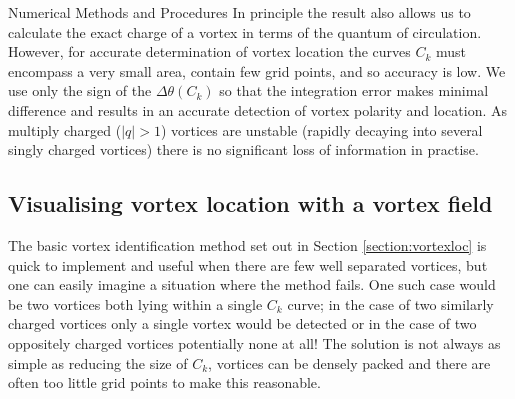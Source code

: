 \begin{chapter}{\label{cha:numerics}Numerical Methods and Procedures}
In principle the result also allows us to calculate the exact charge of a vortex in terms of the quantum of circulation. However, for accurate determination of vortex location the curves $C_k$ must encompass a very small area, contain few grid points, and so accuracy is low. We use only the sign of the $\Delta\theta(C_k)$ so that the integration error makes minimal difference and results in an accurate detection of vortex polarity and location. As multiply charged ($|q|>1$) vortices are unstable (rapidly decaying into several singly charged vortices) there is no significant loss of information in practise.

\subsection{\label{section:vortexfield} Visualising vortex location with a vortex field}
The basic vortex identification method set out in Section \ref{section:vortexloc} is quick to implement and useful when there are few well separated vortices, but one can easily imagine a situation where the method fails. One such case would be two vortices both lying within a single $C_k$ curve; in the case of two similarly charged vortices only a single vortex would be detected or in the case of two oppositely charged vortices potentially none at all! The solution is not always as simple as reducing the size of $C_k$, vortices can be densely packed and there are often too little grid points to make this reasonable.


\end{chapter}
